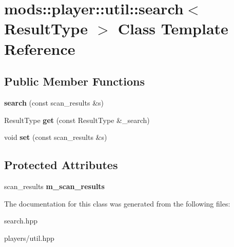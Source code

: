 \hypertarget{classmods_1_1player_1_1util_1_1search}{}\section{mods\+:\+:player\+:\+:util\+:\+:search$<$ Result\+Type $>$ Class Template Reference}
\label{classmods_1_1player_1_1util_1_1search}
\subsection*{Public Member Functions}
\begin{DoxyCompactItemize}
\item 
\mbox{\label{classmods_1_1player_1_1util_1_1search_af8631dbf3e91c6d6fe876f527f1e7c5c}} 
{\bfseries search} (const scan\+\_\+results \&s)
\item 
\mbox{\label{classmods_1_1player_1_1util_1_1search_a26a2847204488c3ffb00f8daad8ca8de}} 
Result\+Type {\bfseries get} (const Result\+Type \&\+\_\+search)
\item 
\mbox{\label{classmods_1_1player_1_1util_1_1search_adaa4430ae8fcf6e765a64515d0933f8d}} 
void {\bfseries set} (const scan\+\_\+results \&s)
\end{DoxyCompactItemize}
\subsection*{Protected Attributes}
\begin{DoxyCompactItemize}
\item 
\mbox{\label{classmods_1_1player_1_1util_1_1search_aae5fb9fcc7ef8d1982300ff7c09f68be}} 
scan\+\_\+results {\bfseries m\+\_\+scan\+\_\+results}
\end{DoxyCompactItemize}


The documentation for this class was generated from the following files\+:\begin{DoxyCompactItemize}
\item 
search.\+hpp\item 
players/util.\+hpp\end{DoxyCompactItemize}
